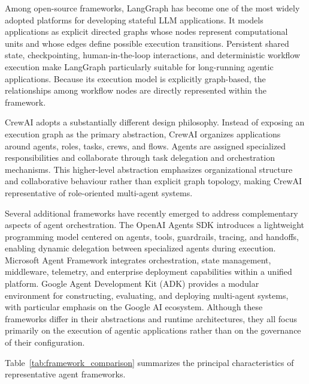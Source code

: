 \documentclass[10pt]{article}
\begin{document}
Among open-source frameworks, LangGraph has become one of the most widely adopted platforms for developing stateful LLM applications. It models applications as explicit directed graphs whose nodes represent computational units and whose edges define possible execution transitions. Persistent shared state, checkpointing, human-in-the-loop interactions, and deterministic workflow execution make LangGraph particularly suitable for long-running agentic applications. Because its execution model is explicitly graph-based, the relationships among workflow nodes are directly represented within the framework.

CrewAI adopts a substantially different design philosophy. Instead of exposing an execution graph as the primary abstraction, CrewAI organizes applications around agents, roles, tasks, crews, and flows. Agents are assigned specialized responsibilities and collaborate through task delegation and orchestration mechanisms. This higher-level abstraction emphasizes organizational structure and collaborative behaviour rather than explicit graph topology, making CrewAI representative of role-oriented multi-agent systems.

Several additional frameworks have recently emerged to address complementary aspects of agent orchestration. The OpenAI Agents SDK introduces a lightweight programming model centered on agents, tools, guardrails, tracing, and handoffs, enabling dynamic delegation between specialized agents during execution. Microsoft Agent Framework integrates orchestration, state management, middleware, telemetry, and enterprise deployment capabilities within a unified platform. Google Agent Development Kit (ADK) provides a modular environment for constructing, evaluating, and deploying multi-agent systems, with particular emphasis on the Google AI ecosystem. Although these frameworks differ in their abstractions and runtime architectures, they all focus primarily on the execution of agentic applications rather than on the governance of their configuration.

Table~\ref{tab:framework_comparison} summarizes the principal characteristics of representative agent frameworks.
\end{document}
